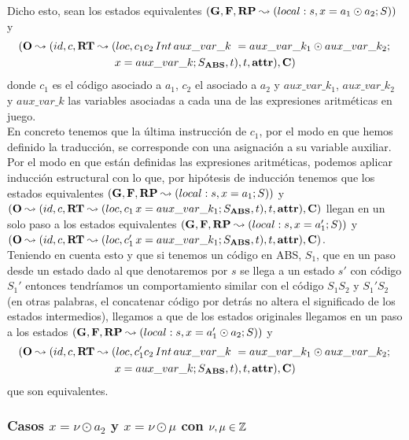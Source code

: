 Dicho esto, sean los estados equivalentes $(\mathbf{G}, \mathbf{F}, \textbf{RP} \leadsto (local:s,x = a_1 \odot a_2\mbox{;\,}S))$ y
\begin{multline*}
  (\mathbf{O} \leadsto (id, c, \textbf{RT} \leadsto (loc, c_1 c_2 \,Int\,aux\_var\_k\ = aux\_var\_k_1 \odot aux\_var\_k_2 \mbox{;\,}\\
  x = aux\_var\_k\mbox{;\,} S_{\textbf{ABS}}, t), t, \textbf{attr}), \mathbf{C})
\end{multline*}
donde $c_1$ es el código asociado a $a_1$, $c_2$ el asociado a $a_2$ y $aux\_var\_k_1$, $aux\_var\_k_2$ y $aux\_var\_k$ las variables asociadas a cada una de las expresiones aritméticas en juego.\\

En concreto tenemos que la última instrucción de $c_1$, por el modo en que hemos definido la traducción, se corresponde con una asignación a su variable auxiliar. Por el modo en que están definidas las expresiones aritméticas, podemos aplicar inducción estructural con lo que, por hipótesis de inducción tenemos que los estados equivalentes $(\mathbf{G}, \mathbf{F}, \textbf{RP} \leadsto (local:s,x = a_1\mbox{;\,}S))$ y $(\mathbf{O} \leadsto (id, c, \textbf{RT} \leadsto (loc, c_1\,x = aux\_var\_k_1\mbox{;\,} S_{\textbf{ABS}}, t), t, \textbf{attr}), \mathbf{C})$ llegan en un solo paso a los estados equivalentes $(\mathbf{G}, \mathbf{F}, \textbf{RP} \leadsto (local:s,x = a_1'\mbox{;\,}S))$ y $(\mathbf{O} \leadsto (id, c, \textbf{RT} \leadsto (loc, c_1'\,x = aux\_var\_k_1\mbox{;\,} S_{\textbf{ABS}}, t), t, \textbf{attr}), \mathbf{C})$.\\

Teniendo en cuenta esto y que si tenemos un código en ABS, $S_1$, que en un paso desde un estado dado al que denotaremos por $s$ se llega a un estado $s'$ con código $S_1'$ entonces tendríamos un comportamiento similar con el código $S_1 S_2$ y $S_1' S_2$ (en otras palabras, el concatenar código por detrás no altera el significado de los estados intermedios), llegamos a que de los estados originales llegamos en un paso a los estados $(\mathbf{G}, \mathbf{F}, \textbf{RP} \leadsto (local:s,x = a_1' \odot a_2\mbox{;\,}S))$ y
\begin{multline*}
  (\mathbf{O} \leadsto (id, c, \textbf{RT} \leadsto (loc, c_1' c_2 \,Int\,aux\_var\_k\ = aux\_var\_k_1 \odot aux\_var\_k_2 \mbox{;\,}\\
  x = aux\_var\_k\mbox{;\,} S_{\textbf{ABS}}, t), t, \textbf{attr}), \mathbf{C})
\end{multline*}
que son equivalentes.

\subsubsection{Casos $x = \nu \odot a_2$ y $x = \nu \odot \mu$ con $\nu, \mu \in \mathbb{Z}$}


